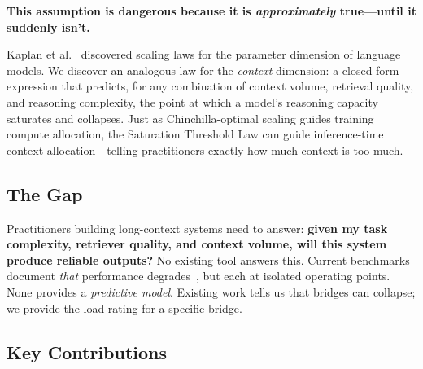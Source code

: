 \documentclass{article}
\begin{document}
\textbf{This assumption is dangerous because it is \emph{approximately} true---until it suddenly isn't.}

Kaplan et al.~\citeyearpar{kaplan2020scaling} discovered scaling laws for the parameter dimension of language models.
We discover an analogous law for the \emph{context} dimension: a closed-form expression that predicts, for any combination of context volume, retrieval quality, and reasoning complexity, the point at which a model's reasoning capacity saturates and collapses.
Just as Chinchilla-optimal scaling guides training compute allocation, the Saturation Threshold Law can guide inference-time context allocation---telling practitioners exactly how much context is too much.

\subsection{The Gap}

Practitioners building long-context systems need to answer: \textbf{given my task complexity, retriever quality, and context volume, will this system produce reliable outputs?}
No existing tool answers this.
Current benchmarks document \emph{that} performance degrades~\citep{liu2023lost,li2025context,levy2024same,hsieh2024ruler}, but each at isolated operating points.
None provides a \emph{predictive model}.
Existing work tells us that bridges can collapse; we provide the load rating for a specific bridge.

\subsection{Key Contributions}
\end{document}
